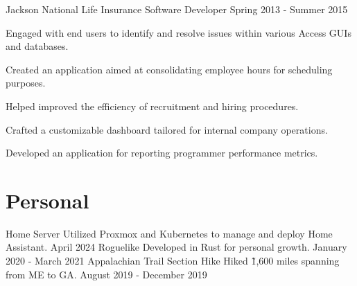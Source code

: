 \documentclass{marvinkassabian_resume}
\begin{document}
		\subsectionpositiondate
				{Jackson National Life Insurance}
				{Software Developer}
				{Spring 2013 - Summer 2015}
		\resumesublistbegin
			\item Engaged with end users to identify and resolve issues within various Access GUIs and databases.
			\item Created an application aimed at consolidating employee hours for scheduling purposes.
			\item Helped improved the efficiency of recruitment and hiring procedures.
			\item Crafted a customizable dashboard tailored for internal company operations.
			\item Developed an application for reporting programmer performance metrics.
		\resumesublistend

	\section{Personal}

		\subsectionlocationdate
				{Home Server}
				{Utilized Proxmox and Kubernetes to manage and deploy Home Assistant.}
				{April 2024}
		\subsectionlocationdate
				{Roguelike}
				{Developed in Rust for personal growth.}
				{January 2020 - March 2021}
		\subsectionlocationdate
				{Appalachian Trail Section Hike}
				{Hiked \~1,600 miles spanning from ME to GA.}
				{August 2019 - December 2019}
\end{document}

